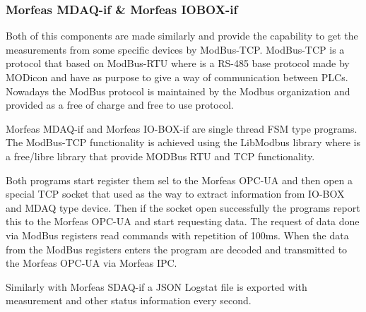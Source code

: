 \subsubsection{Morfeas MDAQ-if \& Morfeas IOBOX-if}
Both of this components are made similarly and provide the capability to get the measurements from some specific devices by ModBus-TCP. ModBus-TCP is a protocol that based on ModBus-RTU where is a RS-485 base protocol made by MODicon and have
as purpose to give a way of communication between PLCs. Nowadays the ModBus protocol is maintained by the Modbus organization and provided as a free of charge and free to use protocol.

Morfeas MDAQ-if and Morfeas IO-BOX-if are single thread FSM type programs. The ModBus-TCP functionality is achieved using the LibModbus library where is a free/libre library that provide MODBus RTU and TCP functionality.

Both programs start register them sel to the Morfeas OPC-UA and then open a special TCP socket that used as the way to extract information from IO-BOX and MDAQ type device. Then if the socket open successfully the programs report this to the Morfeas OPC-UA
and start requesting data. The request of data done via ModBus registers read commands with repetition of 100ms. When the data from the ModBus registers enters the program are decoded and transmitted to the Morfeas OPC-UA via Morfeas IPC.

Similarly with Morfeas SDAQ-if a JSON Logstat file is exported with measurement and other status information every second.